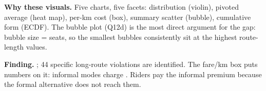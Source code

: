 \textbf{Why these visuals.} Five charts, five facets: distribution
(violin), pivoted average (heat map), per-km cost (box), summary scatter
(bubble), cumulative form (ECDF). The bubble plot (Q12d) is the most
direct argument for the gap: bubble size = seats, so the smallest
bubbles consistently sit at the highest route-length values.

\textbf{Finding.} ; 44 specific long-route violations are
identified. The fare/km box puts numbers on it: informal modes charge
. Riders pay the
informal premium because the formal alternative does not reach them.
